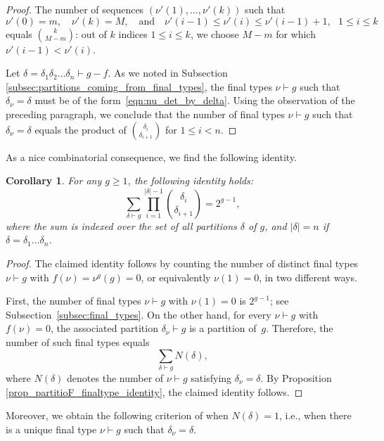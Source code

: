 \documentclass[11pt]{amsart}
\numberwithin{equation}{section}
\theoremstyle{plain}
\newcommand{\<}{\left \langle}
\renewcommand{\>}{\right \rangle}
\newtheorem{cor}[thm]{Corollary}
\theoremstyle{definition}
\theoremstyle{remark}
\begin{document}
\begin{proof}
 The number of sequences $(\nu'(1), \ldots, \nu'(k))$ such that $$\nu'(0) = m,\quad \nu'(k) = M,\quad \text{and}\quad \nu'(i - 1) \leq \nu'(i) \leq \nu'(i -1) + 1,\text{ } 1\leq i \leq k$$ equals ${k \choose M - m}$: out of $k$ indices $1 \leq i \leq k$, we choose $M-m$ for which $\nu'(i - 1) < \nu'(i)$.
 
Let $\delta = \delta_1\delta_2\ldots\delta_n \vdash g - f$. 
As we noted in Subsection \ref{subsec:partitions_coming_from_final_types}, the final types $\nu \vdash g$ such that $\delta_{\nu} = \delta$ must be of the form~\eqref{eqn:nu_det_by_delta}. Using the observation of the preceding paragraph, we conclude that the number of final types $\nu \vdash g$ such that $\delta_{\nu} = \delta$ equals the product of ${\delta_{i} \choose \delta_{i + 1}}$ for $1 \leq i < n$. 
\end{proof}

As a nice combinatorial consequence, we find the following identity. 

\begin{cor}
\label{cor:nice_identity_g_g}
For any $g \geq 1$, the following identity holds: $$ \sum_{\delta \vdash g }\prod_{i = 1}^{|\delta| - 1} {\delta_{i} \choose \delta_{i + 1}} = 2^{g - 1}, $$ where the sum is indexed over the set of all partitions $\delta$ of $g$, and $|\delta| = n$ if~${\delta = \delta_1\ldots\delta_n}$. 
\end{cor}

\begin{proof}
    The claimed identity follows by counting the number of distinct final types $\nu \vdash g$ with $f(\nu) = \nu^g(g) = 0$, or equivalently $\nu(1) = 0$, in two different ways.

    First, the number of final types $\nu \vdash g$ with $\nu(1) = 0$ is $2^{g - 1}$; see Subsection~\ref{subsec:final_types}. On the other hand, for every $\nu \vdash g$ with $f(\nu) = 0$, the associated partition $\delta_\nu \vdash g$ is a partition of~$g$. Therefore, the number of such final types equals $$\sum_{\delta \vdash g} N(\delta),$$ where $N(\delta)$ denotes the number of $\nu \vdash g$ satisfying $\delta_\nu = \delta$. By Proposition \ref{prop_partitioF_finaltype_identity}, the claimed identity follows.
\end{proof}

Moreover, we obtain the following criterion of when $N(\delta) = 1$, i.e., when there is a unique final type $\nu \vdash g$ such that $\delta_{\nu} = \delta$. 
\end{document}
